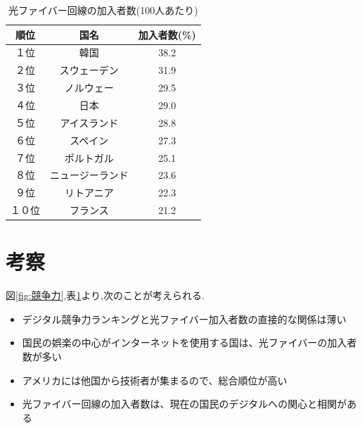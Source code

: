 \documentclass[a4paper,11pt,dvipdfmx]{ujarticle}
\begin{document}
\begin{table}[htbp]
    \centering
    \caption{光ファイバー回線の加入者数(100人あたり)}
    \label{fig:加入者数}

    \begin{tabular}{|c|c|c|}\hline
        順位 & 国名 & 加入者数(\%) \\
        \hline
        １位 & 韓国 & 38.2 \\
        \hline
        ２位 & スウェーデン & 31.9 \\
        \hline
        ３位 & ノルウェー & 29.5 \\
        \hline
        ４位 & 日本 & 29.0 \\
        \hline
        ５位 & アイスランド & 28.8 \\
        \hline
        ６位 & スペイン & 27.3 \\
        \hline 
        ７位 & ポルトガル & 25.1 \\
        \hline
        ８位 & ニュージーランド & 23.6 \\
        \hline
        ９位 & リトアニア & 22.3 \\
        \hline
        １０位 & フランス & 21.2 \\
        \hline
    \end{tabular}
\end{table}

\section{考察}
%

図\ref{fig:競争力},表\ref{fig:加入者数}より,次のことが考えられる.
\begin{itemize}
    \item デジタル競争力ランキングと光ファイバー加入者数の直接的な関係は薄い
    \item 国民の娯楽の中心がインターネットを使用する国は、光ファイバーの加入者数が多い
    \item アメリカには他国から技術者が集まるので、総合順位が高い
    \item 光ファイバー回線の加入者数は、現在の国民のデジタルへの関心と相関がある
\end{itemize}

%


\end{document}
